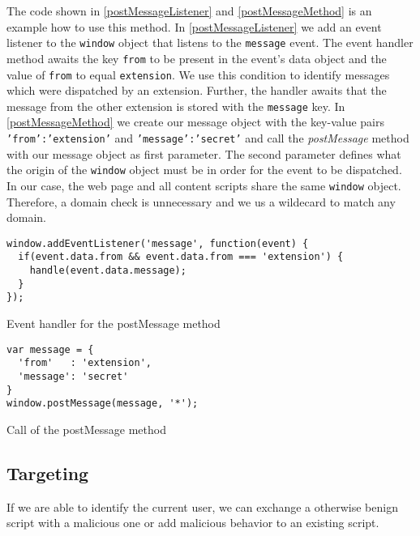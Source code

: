 			The code shown in \autoref{postMessageListener} and \autoref{postMessageMethod} is an example how to use this method. In \autoref{postMessageListener} we add an event listener to the \texttt{window} object that listens to the \texttt{message} event. The event handler method awaits the key \texttt{from} to be present in the event's data object and the value of \texttt{from} to equal \texttt{extension}. We use this condition to identify messages which were dispatched by an extension. Further, the handler awaits that the message from the other extension is stored with the \texttt{message} key. In \autoref{postMessageMethod} we create our message object with the key-value pairs \texttt{'from':'extension'} and \texttt{'message':'secret'} and call the \textit{postMessage} method with our message object as first parameter. The second parameter defines what the origin of the \texttt{window} object must be in order for the event to be dispatched. In our case, the web page and all content scripts share the same \texttt{window} object. Therefore, a domain check is unnecessary and we us a wildecard to match any domain.
			
			\begin{code}
				\begin{lstlisting}
window.addEventListener('message', function(event) {
  if(event.data.from && event.data.from === 'extension') {
    handle(event.data.message);
  }
});
				\end{lstlisting}
				\caption{Event handler for the postMessage method}
				\label{postMessageListener}
			\end{code}
			
			\begin{code}
				\begin{lstlisting}
var message = {
  'from'   : 'extension',
  'message': 'secret'
}
window.postMessage(message, '*');
				\end{lstlisting}
				\caption{Call of the postMessage method}
				\label{postMessageMethod}
			\end{code}
	
	\subsection{Targeting}
	
		If we are able to identify the current user, we can exchange a otherwise benign script with a malicious one or add malicious behavior to an existing script. 
	

